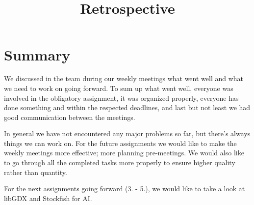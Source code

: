 \documentclass{article}
\title{Retrospective}
\date{}
\begin{document}
\maketitle

\section * {Summary}
We discussed in the team during our weekly meetings what went well and what we need to work on going forward. To sum up what went well, everyone was involved in the obligatory assignment, it was organized properly, everyone has done something and within the respected deadlines, and last but not least we had good communication between the meetings.

In general we have not encountered any major problems so far, but there’s always things we can work on. For the future assignments we would like to make the weekly meetings more effective; more planning pre-meetings. We would also like to go through all the completed tasks more properly to ensure higher quality rather than quantity.

For the next assignments going forward (3. - 5.), we would like to take a look at libGDX and Stockfish for AI.
\end{document}
